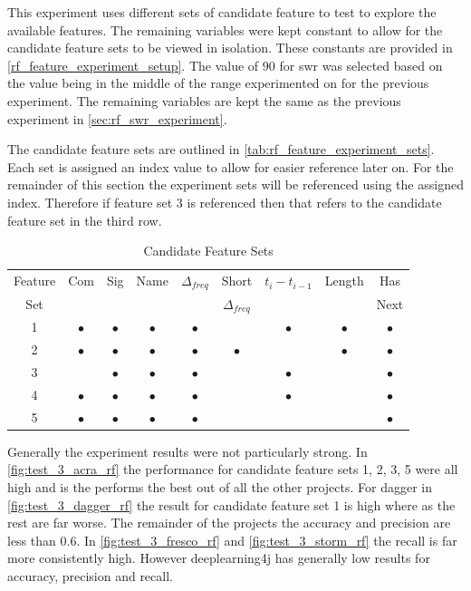 This experiment uses different sets of candidate feature to test to explore the available features. The remaining variables were kept constant to allow for the candidate feature sets to be viewed in isolation. These constants are provided in \autoref{rf_feature_experiment_setup}. The value of $90$ for \gls{swr} was selected based on the value being in the middle of the range experimented on for the previous experiment. The remaining variables are kept the same as the previous experiment in \autoref{sec:rf_swr_experiment}. 

The candidate feature sets are outlined in \autoref{tab:rf_feature_experiment_sets}. Each set is assigned an index value to allow for easier reference later on. For the remainder of this section the experiment sets will be referenced using the assigned index. Therefore if feature set 3 is referenced then that refers to the candidate feature set in the third row.

\begin{table}[h]
\begin{center}

    \begin{tabular}{|c|c|c|c|c|c|c|c|c|}
        \hline
        Feature & Com & Sig & Name & $\Delta_{freq}$ & Short & $t_{i} - t_{i-1}$ & Length & Has \\
        Set & & & & & $\Delta_{freq}$ & & & Next \\ \hline
        1 & $\bullet$ & $\bullet$ & $\bullet$ & $\bullet$ & & $\bullet$ & $\bullet$ & $\bullet$ \\
        2 & $\bullet$ & $\bullet$ & $\bullet$ & $\bullet$ & $\bullet$ & & $\bullet$ & $\bullet$ \\
        3 & & $\bullet$ & $\bullet$ & $\bullet$ & & $\bullet$ & & $\bullet$ \\
        4 & $\bullet$ & $\bullet$ & $\bullet$ & $\bullet$ & & $\bullet$ & & $\bullet$ \\
        5 & $\bullet$ & $\bullet$ & $\bullet$ & $\bullet$ & & & & $\bullet$ \\ \hline
    \end{tabular}
    \caption{Candidate Feature Sets}
    \label{tab:rf_feature_experiment_sets}
\end{center}

\end{table}

Generally the experiment results were not particularly strong. In \autoref{fig:test_3_acra_rf} the performance for candidate feature sets 1, 2, 3, 5 were all high and is the performs the best out of all the other projects. For dagger in \autoref{fig:test_3_dagger_rf} the result for candidate feature set 1 is high where as the rest are far worse. The remainder of the projects the accuracy and precision are less than $0.6$. In \autoref{fig:test_3_fresco_rf} and \autoref{fig:test_3_storm_rf} the recall is far more consistently high. However deeplearning4j has generally low results for accuracy, precision and recall.

